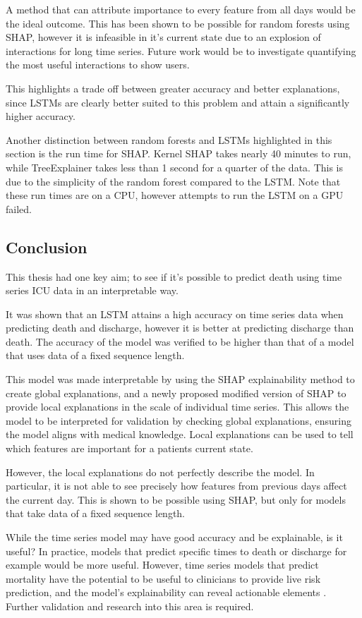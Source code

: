 \documentclass[12pt]{article}
\begin{document}
A method that can attribute importance to every feature from all days would be the ideal outcome. This has been shown to be possible for random forests using SHAP, however it is infeasible in it's current state due to an explosion of interactions for long time series. Future work would be to investigate quantifying the most useful interactions to show users. 

This highlights a trade off between greater accuracy and better explanations, since LSTMs are clearly better suited to this problem and attain a significantly higher accuracy.

Another distinction between random forests and LSTMs highlighted in this section is the run time for SHAP. Kernel SHAP takes nearly 40 minutes to run, while TreeExplainer takes less than 1 second for a quarter of the data. This is due to the simplicity of the random forest compared to the LSTM. Note that these run times are on a CPU, however attempts to run the LSTM on a GPU failed. 

\subsection{Conclusion}

This thesis had one key aim; to see if it's possible to predict death using time series ICU data in an interpretable way.

It was shown that an LSTM attains a high accuracy on time series data when predicting death and discharge, however it is better at predicting discharge than death. The accuracy of the model was verified to be higher than that of a model that uses data of a fixed sequence length.

This model was made interpretable by using the SHAP explainability method to create global explanations, and a newly proposed modified version of SHAP to provide local explanations in the scale of individual time series. This allows the model to be interpreted for validation by checking global explanations, ensuring the model aligns with medical knowledge. Local explanations can be used to tell which features are important for a patients current state. 

However, the local explanations do not perfectly describe the model. In particular, it is not able to see precisely how features from previous days affect the current day. This is shown to be possible using SHAP, but only for models that take data of a fixed sequence length. 

While the time series model may have good accuracy and be explainable, is it useful? In practice, models that predict specific times to death or discharge for example would be more useful. However, time series models that predict mortality have the potential to be useful to clinicians to provide live risk prediction, and the model's explainability can reveal actionable elements \cite{ICUFancyLSTM}. Further validation and research into this area is required. 
\end{document}
